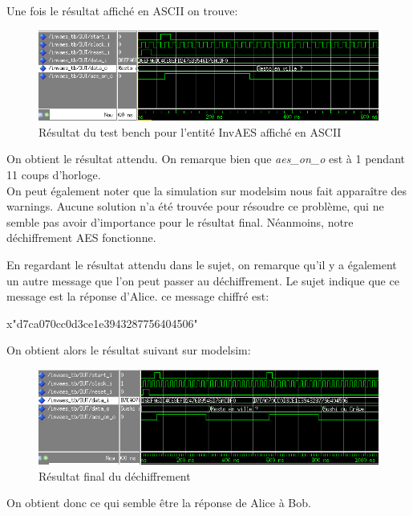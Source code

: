 \documentclass[a4paper, 12pt]{article}
\begin{document}
Une fois le résultat affiché en ASCII on trouve:
			\begin{figure}[H]
				\begin{center}
				\includegraphics[scale=0.68]{Images/InvAESTb2.png}
				\end{center}
				\caption{Résultat du test bench pour l'entité InvAES affiché en ASCII}
				\label{InvAESRoundTb2}
			\end{figure}
On obtient le résultat attendu. On remarque bien que \emph{aes\_on\_o} est à 1 pendant 11 coups d'horloge.\\ On peut également noter que la simulation sur modelsim nous fait apparaître des warnings. Aucune solution n'a été trouvée pour résoudre ce problème, qui ne semble pas avoir d'importance pour le résultat final.
Néanmoins, notre déchiffrement AES fonctionne.

En regardant le résultat attendu dans le sujet, on remarque qu'il y a également un autre message que l'on peut passer au déchiffrement. Le sujet indique que ce message est la réponse d'Alice. ce message chiffré est: \par \begin{center}{\selectfont x"d7ca070cc0d3ce1e3943287756404506"} \end{center} \par On obtient alors le résultat suivant sur modelsim:
			\begin{figure}[H]
				\begin{center}
				\includegraphics[scale=0.68]{Images/InvAESTb3.png}
				\end{center}
				\caption{Résultat final du déchiffrement}
				\label{InvAESRoundTb3}
			\end{figure}
On obtient donc ce qui semble être la réponse de Alice à Bob.
\end{document}
